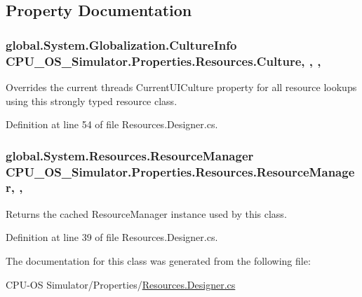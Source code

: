 \subsection{Property Documentation}
\hypertarget{class_c_p_u___o_s___simulator_1_1_properties_1_1_resources_afb07c44f770e3a53a2df87db2ebd9af3}{}
\subsubsection[{Culture}]{\setlength{\rightskip}{0pt plus 5cm}global.\+System.\+Globalization.\+Culture\+Info C\+P\+U\+\_\+\+O\+S\+\_\+\+Simulator.\+Properties.\+Resources.\+Culture\hspace{0.3cm}{\ttfamily [static]}, {\ttfamily [get]}, {\ttfamily [set]}, {\ttfamily [package]}}\label{class_c_p_u___o_s___simulator_1_1_properties_1_1_resources_afb07c44f770e3a53a2df87db2ebd9af3}


Overrides the current thread\textquotesingle{}s Current\+U\+I\+Culture property for all resource lookups using this strongly typed resource class. 



Definition at line 54 of file Resources.\+Designer.\+cs.

\hypertarget{class_c_p_u___o_s___simulator_1_1_properties_1_1_resources_a59a57fa23c17b7afe97c18c6cb3c30cc}{}
\subsubsection[{Resource\+Manager}]{\setlength{\rightskip}{0pt plus 5cm}global.\+System.\+Resources.\+Resource\+Manager C\+P\+U\+\_\+\+O\+S\+\_\+\+Simulator.\+Properties.\+Resources.\+Resource\+Manager\hspace{0.3cm}{\ttfamily [static]}, {\ttfamily [get]}, {\ttfamily [package]}}\label{class_c_p_u___o_s___simulator_1_1_properties_1_1_resources_a59a57fa23c17b7afe97c18c6cb3c30cc}


Returns the cached Resource\+Manager instance used by this class. 



Definition at line 39 of file Resources.\+Designer.\+cs.



The documentation for this class was generated from the following file\+:\begin{DoxyCompactItemize}
\item 
C\+P\+U-\/\+O\+S Simulator/\+Properties/\hyperlink{_resources_8_designer_8cs}{Resources.\+Designer.\+cs}\end{DoxyCompactItemize}
